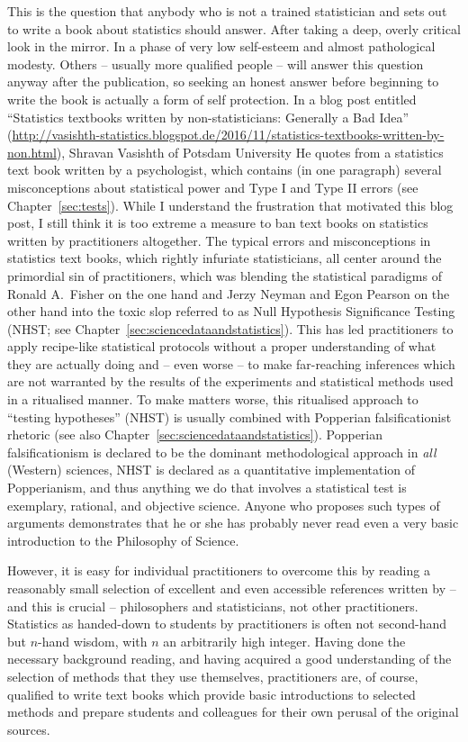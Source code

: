 This is the question that anybody who is not a trained statistician and sets out to write a book about statistics should answer.
After taking a deep, overly critical look in the mirror.
In a phase of very low self-esteem and almost pathological modesty.
Others -- usually more qualified people -- will answer this question anyway after the publication, so seeking an honest answer before beginning to write the book is actually a form of self protection.
In a blog post entitled ``Statistics textbooks written by non-statisticians: Generally a Bad Idea'' (\url{http://vasishth-statistics.blogspot.de/2016/11/statistics-textbooks-written-by-non.html}), Shravan Vasishth of Potsdam University 
He quotes from a statistics text book written by a psychologist, which contains (in one paragraph) several misconceptions about statistical power and Type I and Type II errors (see Chapter~\ref{sec:tests}).
While I understand the frustration that motivated this blog post, I still think it is too extreme a measure to ban text books on statistics written by practitioners altogether.
The typical errors and misconceptions in statistics text books, which rightly infuriate statisticians, all center around the primordial sin of practitioners, which was blending the statistical paradigms of Ronald A.\ Fisher on the one hand and Jerzy Neyman and Egon Pearson on the other hand into the toxic slop referred to as Null Hypothesis Significance Testing (NHST; see Chapter~\ref{sec:sciencedataandstatistics}).
This has led practitioners to apply recipe-like statistical protocols without a proper understanding of what they are actually 
doing and -- even worse -- to make far-reaching inferences which are not warranted by the results of the experiments and statistical methods used in a ritualised manner.
To make matters worse, this ritualised approach to ``testing hypotheses'' (NHST) is usually combined with Popperian falsificationist rhetoric (see also Chapter~\ref{sec:sciencedataandstatistics}).
Popperian falsificationism is declared to be the dominant methodological approach in \textit{all} (Western) sciences, NHST is declared as a quantitative implementation of Popperianism, and thus anything we do that involves a statistical test is exemplary, rational, and objective science.
Anyone who proposes such types of arguments demonstrates that he or she has probably never read even a very basic introduction to the Philosophy of Science.

However, it is easy for individual practitioners to overcome this by reading a reasonably small selection of excellent and even accessible references written by -- and this is crucial -- philosophers and statisticians, not other practitioners.
Statistics as handed-down to students by practitioners is often not second-hand but $n$-hand wisdom, with $n$ an arbitrarily high integer.
Having done the necessary background reading, and having acquired a good understanding of the selection of methods that they use themselves, practitioners are, of course, qualified to write text books which provide basic introductions to selected methods and prepare students and colleagues for their own perusal of the original sources.

